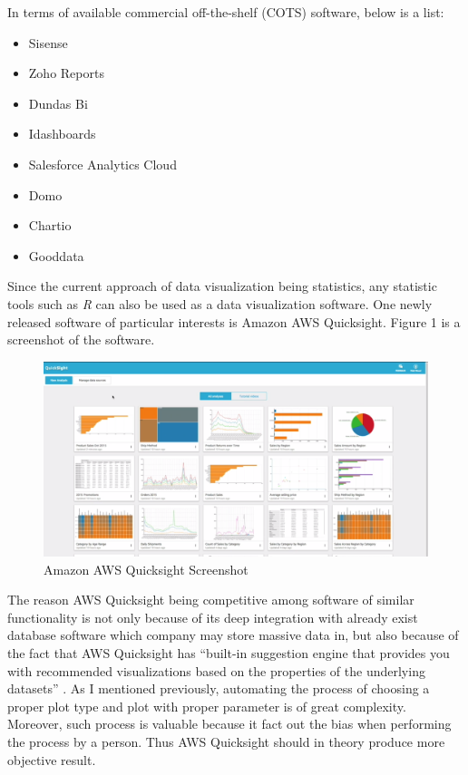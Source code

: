 \documentclass[12pt]{article}
\begin{document}
\begin{flushleft}
In terms of available commercial off-the-shelf (COTS) software, below is a list:
\begin{singlespace}
\begin{itemize}
	\item Sisense
	\item Zoho Reports
	\item Dundas Bi
	\item Idashboards
	\item Salesforce Analytics Cloud
	\item Domo
	\item Chartio
	\item Gooddata
\end{itemize}
\end{singlespace}
Since the current approach of data visualization being statistics, any statistic tools such as \emph{R} can also be used as a data visualization software. One newly released software of particular interests is Amazon AWS Quicksight. Figure 1 is a screenshot of the software.
\begin{figure}[h]
\centering
        \includegraphics[totalheight=9cm]{screenshot.png}
    \caption{Amazon AWS Quicksight Screenshot}
\end{figure}
The reason AWS Quicksight being competitive among software of similar functionality is not only because of its deep integration with already exist database software which company may store massive data in, but also because of the fact that AWS Quicksight has ``built-in suggestion engine that provides you with recommended visualizations based on the properties of the underlying datasets'' \cite{awsq}. As I mentioned previously, automating the process of choosing a proper plot type and plot with proper parameter is of great complexity. Moreover, such process is valuable because it fact out the bias when performing the process by a person. Thus AWS Quicksight should in theory produce more objective result.


\end{flushleft}
\end{document}
